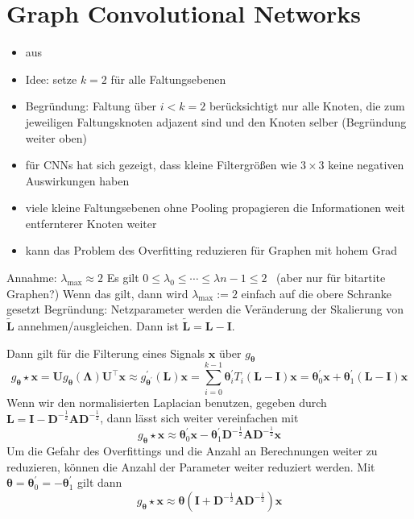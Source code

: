 \section{Graph Convolutional Networks}

\begin{itemize}
  \item aus~\cite{GCN}
  \item Idee: setze $k = 2$ für alle Faltungsebenen
  \item Begründung: Faltung über $i < k = 2$ berücksichtigt nur alle Knoten, die zum jeweiligen Faltungsknoten adjazent sind und den Knoten selber (Begründung weiter oben)
  \item für CNNs hat sich gezeigt, dass kleine Filtergrößen wie $3 \times 3$ keine negativen Auswirkungen haben
  \item viele kleine Faltungsebenen ohne Pooling propagieren die Informationen weit entfernterer Knoten weiter 
  \item kann das Problem des Overfitting reduzieren für Graphen mit hohem Grad
\end{itemize}

Annahme: $\lambda_{\max} \approx 2$ 
Es gilt $0 \leq \lambda_0 \leq \cdots \leq \lambda{n-1} \leq 2$~\cite{Chung} (aber nur für bitartite Graphen?)
Wenn das gilt, dann wird $\lambda_{\max} := 2$ einfach auf die obere Schranke gesetzt
Begründung: Netzparameter werden die Veränderung der Skalierung von $\mathbf{\tilde L}$ annehmen/ausgleichen.
Dann ist $\mathbf{\tilde L} = \mathbf{L} - \mathbf{I}$.

Dann gilt für die Filterung eines Signals $\mathbf{x}$ über $g_{\mathbf{\theta}}$
\begin{equation}
  g_{\mathbf{\theta}} \star \mathbf{x} = \mathbf{U}g_{\mathbf{\theta}}\left(\mathbf{\Lambda}\right)\mathbf{U}^{\top}\mathbf{x} \approx g^{\prime}_{\mathbf{\theta^{\prime}}} \left(\mathbf{L}\right) \mathbf{x} = \sum_{i=0}^{k-1} \mathbf{\theta}^{\prime}_i T_i \left(\mathbf{L} - \mathbf{I}\right) \mathbf{x} = \mathbf{\theta}^{\prime}_0 \mathbf{x} + \mathbf{\theta}^{\prime}_1 \left(\mathbf{L} - \mathbf{I}\right) \mathbf{x}
\end{equation}
Wenn wir den normalisierten Laplacian benutzen, gegeben durch $\mathbf{L} = \mathbf{I} - \mathbf{D}^{-\frac{1}{2}} \mathbf{A} \mathbf{D}^{-\frac{1}{2}}$, dann lässt sich weiter vereinfachen mit
\begin{equation}
  g_{\mathbf{\theta}} \star \mathbf{x} \approx \mathbf{\theta}^{\prime}_0 \mathbf{x} - \mathbf{\theta}^{\prime}_1 \mathbf{D}^{-\frac{1}{2}} \mathbf{A} \mathbf{D}^{-\frac{1}{2}} \mathbf{x}
\end{equation}
Um die Gefahr des Overfittings und die Anzahl an Berechnungen weiter zu reduzieren, können die Anzahl der Parameter weiter reduziert werden.
Mit $\mathbf{\theta} = \mathbf{\theta}^{\prime}_0 = - \mathbf{\theta}^{\prime}_1$ gilt dann
\begin{equation}
  g_{\mathbf{\theta}} \star \mathbf{x} \approx \mathbf{\theta} \left(\mathbf{I} + \mathbf{D}^{-\frac{1}{2}} \mathbf{A} \mathbf{D}^{-\frac{1}{2}}\right) \mathbf{x}
\end{equation}

